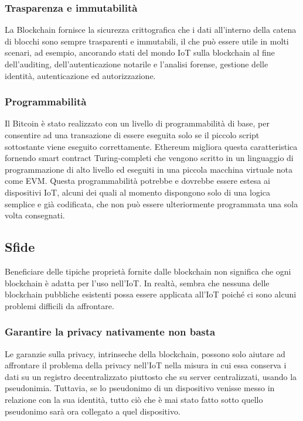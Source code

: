 \documentclass[a4paper,12pt]{article}
\begin{document}
\subsubsection{Trasparenza e immutabilità}
La Blockchain fornisce la sicurezza crittografica che i dati all'interno della catena di blocchi sono sempre trasparenti e immutabili, il che può essere utile in molti scenari, ad esempio, ancorando stati del mondo IoT sulla blockchain al fine dell'auditing, dell'autenticazione notarile e l'analisi forense, gestione delle identità, autenticazione ed autorizzazione.

\subsubsection{Programmabilità}
Il Bitcoin è stato realizzato con un livello di programmabilità di base, per consentire ad una transazione di essere eseguita solo se il piccolo script sottostante viene eseguito correttamente. Ethereum migliora questa caratteristica
fornendo smart contract Turing-completi che vengono scritto in un linguaggio di programmazione di alto livello ed eseguiti in una piccola macchina virtuale nota come EVM. Questa programmabilità potrebbe e dovrebbe essere estesa ai dispositivi IoT, alcuni dei quali al momento dispongono solo di una logica semplice e già codificata, che non può essere ulteriormente programmata una sola volta consegnati.

\subsection{Sfide}
Beneficiare delle tipiche proprietà fornite dalle blockchain non significa che ogni blockchain è adatta per l'uso nell'IoT. In realtà, sembra che nessuna delle blockchain pubbliche esistenti possa essere applicata all'IoT poiché ci sono alcuni problemi difficili da affrontare.

\subsubsection{Garantire la privacy nativamente non basta}
Le garanzie sulla privacy, intrinseche della blockchain, possono solo aiutare ad affrontare il problema della privacy
nell'IoT nella misura in cui essa conserva i dati su un registro decentralizzato piuttosto che su server centralizzati, usando la pseudonimia. Tuttavia, se lo pseudonimo di un dispositivo venisse messo in relazione con la sua identità, tutto ciò che è mai stato fatto sotto quello pseudonimo sarà ora collegato a quel dispositivo.
\end{document}
